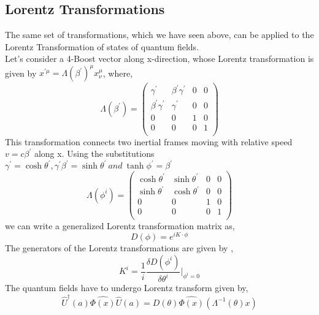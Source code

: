 \subsection{Lorentz Transformations}
The same set of transformations, which we have seen above, can be applied to the Lorentz Transformation of states of quantum fields. \\
Let's consider a 4-Boost vector along x-direction, whose Lorentz transformation is given by $x^{' \mu} = \Lambda(\beta^{'})^{\mu} x_{\nu}^{\mu}$, where, 
\begin{equation}
    \Lambda(\beta^{'}) = \begin{pmatrix}
    \gamma^{'} & \beta^{'}\gamma^{'} & 0 & 0 \\
    \beta^{'}\gamma^{'} & \gamma^{'} & 0 & 0 \\
    0 & 0 & 1 & 0 \\
    0 & 0 & 0 & 1 \\
    \end{pmatrix}
\end{equation}
This transformation connects two inertial frames moving with relative speed $v = c \beta^{'}$ along x. Using the substitutions $\gamma^{'}= \cosh{\theta^{'}} , \gamma^{'}\beta^{'} = \sinh{\theta^{'}} \: and \: \tanh{\phi^{'}} = \beta^{'}$
\begin{equation}
    \Lambda(\phi^{i}) = \begin{pmatrix}
    \cosh{\theta^{'}} & \sinh{\theta^{'}} & 0 & 0 \\
    \sinh{\theta^{'}} & \cosh{\theta^{'}} & 0 & 0 \\
    0 & 0 & 1 & 0 \\
    0 & 0 & 0 & 1 \\
    \end{pmatrix}
\end{equation}
we can write a generalized Lorentz transformation matrix as, 
\begin{equation}
    D(\phi) = e^{iK \cdot \phi}
\end{equation}
The generators of the Lorentz transformations are given by ,
\begin{equation}
K^{i} = \frac{1}{i} \frac{\delta D(\phi^{i})}{\delta \theta^{i}}|_{\phi^{i} = 0}
\end{equation}
The quantum fields have to undergo Lorentz transform given by,
\begin{equation}
     \hat{U}^{\dagger}(a) \hat{\Phi(x)} \hat{U}(a) = D(\theta) \hat{\Phi(x)} (\Lambda^{-1}(\theta)x)
\end{equation}
